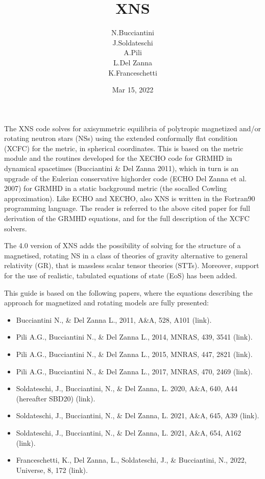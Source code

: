 \documentclass[letterpaper,10pt,english]{sphinxmanual}
\title{XNS}
\date{Mar 15, 2022}
\author{N.Bucciantini \\J.Soldateschi\\ A.Pili\\ L.Del Zanna \\K.Franceschetti}
\begin{document}
\pagestyle{empty}
\sphinxmaketitle
\pagestyle{plain}
\sphinxtableofcontents
\pagestyle{normal}
\label{\detokenize{index::doc}}


\sphinxAtStartPar
The XNS code solves for axisymmetric equilibria of polytropic magnetized and/or rotating neutron stars (NSs) using the extended conformally flat condition (XCFC) for the metric, in spherical coordinates. This is based on the metric module and the routines developed for the X\sphinxhyphen{}ECHO code for GRMHD in dynamical spacetimes (Bucciantini \& Del Zanna 2011), which in turn is an upgrade of the Eulerian conservative high\sphinxhyphen{}order code (ECHO Del Zanna et al. 2007) for GRMHD in a static background metric (the so\sphinxhyphen{}called Cowling approximation). Like ECHO and X\sphinxhyphen{}ECHO, also XNS is written in the Fortran90 programming language. The reader is referred to the above cited paper for full derivation of the GRMHD equations, and for the full description of the XCFC solvers.

\sphinxAtStartPar
The 4.0 version of XNS adds the possibility of solving for the structure of a magnetised, rotating NS in a class of theories of gravity alternative to general relativity (GR), that is massless scalar tensor theories (STTs). Moreover, support for the use of realistic, tabulated equations of state (EoS) has been added.

\sphinxAtStartPar
This guide is based on the following papers, where the equations describing the approach for magnetized and rotating models are fully presented:
\begin{itemize}
\item {} 
\sphinxAtStartPar
Bucciantini N., \& Del Zanna L., 2011, A\&A, 528, A101 (link).

\item {} 
\sphinxAtStartPar
Pili A.G., Bucciantini N., \& Del Zanna L., 2014, MNRAS, 439, 3541 (link).

\item {} 
\sphinxAtStartPar
Pili A.G., Bucciantini N., \& Del Zanna L., 2015, MNRAS, 447, 2821 (link).

\item {} 
\sphinxAtStartPar
Pili A.G., Bucciantini N., \& Del Zanna L., 2017, MNRAS, 470, 2469 (link).

\item {} 
\sphinxAtStartPar
Soldateschi, J., Bucciantini, N., \& Del Zanna, L. 2020, A\&A, 640, A44 (hereafter SBD20) (link).

\item {} 
\sphinxAtStartPar
Soldateschi, J., Bucciantini, N., \& Del Zanna, L. 2021, A\&A, 645, A39 (link).

\item {} 
\sphinxAtStartPar
Soldateschi, J., Bucciantini, N., \& Del Zanna, L. 2021, A\&A, 654, A162 (link).

\item {} 
\sphinxAtStartPar
Franceschetti, K., Del Zanna, L., Soldateschi, J., \& Bucciantini, N., 2022, Universe, 8, 172 (link).

\end{itemize}
\end{document}
